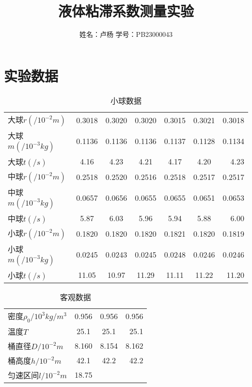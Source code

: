 \documentclass{article}
\title{液体粘滞系数测量实验}
\author{姓名：卢杨 \quad 学号：PB23000043}
\begin{document}
\maketitle
\section{实验数据}

\begin{table}[!hbtp]
    \begin{center}
    \caption{小球数据}
    \begin{tabular}{l|c|c|c|c|c|r}
        \hline
        大球$r(/10^{-2}m)$ & 0.3018 & 0.3020 & 0.3020 & 0.3015 & 0.3021 & 0.3018 \\
        大球$m(/10^{-3}kg)$ & 0.1136 & 0.1136 & 0.1136 & 0.1137 & 0.1128 & 0.1134 \\
        大球$t(/s)$ & 4.16 & 4.23 & 4.21 & 4.17 & 4.20 & 4.23 \\
        中球$r(/10^{-2}m)$ & 0.2518 & 0.2520 & 0.2516 & 0.2518 & 0.2517 & 0.2517 \\
        中球$m(/10^{-3}kg)$ & 0.0657 & 0.0656 & 0.0655 & 0.0655 & 0.0651 & 0.0653 \\
        中球$t(/s)$ & 5.87 & 6.03 & 5.96 & 5.94 & 5.88 & 6.00 \\
        小球$r(/10^{-2}m)$ & 0.1820 & 0.1820 & 0.1820 & 0.1821 & 0.1820 & 0.1819 \\
        小球$m(/10^{-3}kg)$ & 0.0245 & 0.0243 & 0.0245 & 0.0248 & 0.0246 & 0.0246 \\
        小球$t(/s)$ & 11.05 & 10.97 & 11.29 & 11.11 & 11.22 & 11.20 \\
    \end{tabular}
    \end{center}
\end{table}


\begin{table}[!hbtp]
    \begin{center}
    \caption{客观数据}
    \begin{tabular}{l|c|c|r}
        \hline
        密度$\rho _0/10^{3}kg/m^3$ &0.956 & 0.956 & 0.956 \\
        温度$T$ & 25.1 & 25.1 & 25.1 \\
        桶直径$D/10^{-2}m$ & 8.160 & 8.154 & 8.162 \\
        桶高度$h/10^{-2}m$ & 42.1 & 42.2 & 42.2 \\
        匀速区间$l/10^{-2}m$ & 18.75 \\
    \end{tabular}
    \end{center}
\end{table}
\end{document}
